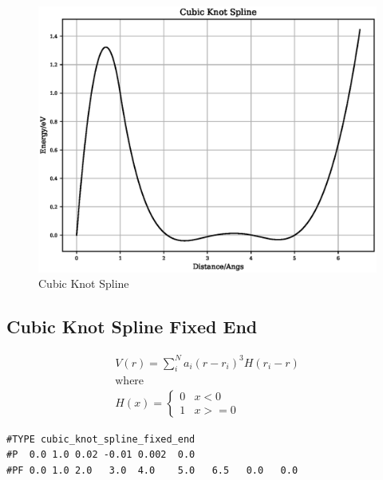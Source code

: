 \documentclass[12pt,twoside]{manual}
\begin{document}
\begin{appendices}
\FloatBarrier
\begin{figure}[h]
  \begin{center}
    \includegraphics[scale=0.5]{img/plots/cubic_knot_spline.eps}
    \caption{Cubic Knot Spline}
    \label{graph:graph1}
  \end{center}
\end{figure}
\FloatBarrier





\subsection{Cubic Knot Spline Fixed End}

\begin{equation}
\begin{split}
V(r) = \sum_i^N a_i (r - r_i)^3 H(r_i - r) \\
\text{where } \\
H(x) = \left\{ \begin{matrix} 0 & x<0 \\  1 & x >= 0 \end{matrix} \right . 
\end{split}
\label{eq:cubicKnotSplineFixedEnd}
\end{equation}


\begin{lstlisting}[style=pseudocode,caption={Cubic Knot Spline Fixed End}]
#TYPE cubic_knot_spline_fixed_end
#P  0.0 1.0 0.02 -0.01 0.002  0.0
#PF 0.0 1.0 2.0   3.0  4.0    5.0   6.5   0.0   0.0
\end{lstlisting}


\end{appendices}
\end{document}

